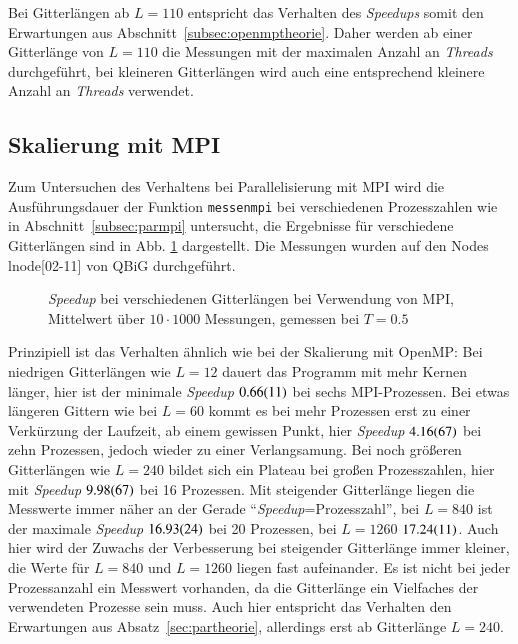 	
	Bei Gitterlängen ab $L=110$ entspricht das Verhalten des \textit{Speedups} somit den Erwartungen aus Abschnitt~\ref{subsec:openmptheorie}. Daher werden ab einer Gitterlänge von $L=110$ die Messungen mit der maximalen Anzahl an \textit{Threads} durchgeführt, bei kleineren Gitterlängen wird auch eine entsprechend kleinere Anzahl an \textit{Threads} verwendet. 
	
	\subsection{Skalierung mit MPI}
	\label{subsec:ergebnissempi}
	
	Zum Untersuchen des Verhaltens bei Parallelisierung mit MPI wird die Ausführungsdauer der Funktion \texttt{messenmpi} bei verschiedenen Prozesszahlen wie in Abschnitt~\ref{subsec:parmpi} untersucht, die Ergebnisse für verschiedene Gitterlängen sind in Abb. \ref{fig:skalierunglaengempi} dargestellt. Die Messungen wurden auf den Nodes lnode[02-11] von QBiG durchgeführt.
	
		\begin{figure}[htbp]
			
			\caption[\textit{Speedup} bei verschiedenen Gitterlängen bei Verwendung von MPI]{\textit{Speedup} bei verschiedenen Gitterlängen bei Verwendung von MPI, Mittelwert über $10 \cdot 1000$ Messungen, gemessen bei $T=\num{0,5}$}
			\label{fig:skalierunglaengempi}
		\end{figure}
		
	Prinzipiell ist das Verhalten ähnlich wie bei der Skalierung mit OpenMP: Bei niedrigen Gitterlängen wie $L=12$ dauert das Programm mit mehr Kernen länger, hier ist der minimale \textit{Speedup} $\num{0,66\pm0,11}$ bei sechs MPI-Prozessen. Bei etwas längeren Gittern wie bei $L=60$ kommt es bei mehr Prozessen erst zu einer Verkürzung der Laufzeit, ab einem gewissen Punkt, hier \textit{Speedup} $\num{4,16\pm0,67}$ bei zehn Prozessen, jedoch wieder zu einer Verlangsamung. Bei noch größeren Gitterlängen wie $L=240$ bildet sich ein Plateau bei großen Prozesszahlen, hier mit \textit{Speedup} $\num{9,98\pm 0,67}$ bei 16 Prozessen. Mit steigender Gitterlänge liegen die Messwerte immer näher an der Gerade \enquote{\textit{Speedup}=Prozesszahl}, bei $L=840$ ist der maximale \textit{Speedup} $\num{16,93\pm0,24}$ bei 20 Prozessen, bei $L=1260$ $\num{17,24\pm0,11}$. Auch hier wird der Zuwachs der Verbesserung bei steigender Gitterlänge immer kleiner, die Werte für $L=840$ und $L=1260$ liegen fast aufeinander. Es ist nicht bei jeder Prozessanzahl ein Messwert vorhanden, da die Gitterlänge ein Vielfaches der verwendeten Prozesse sein muss.
	Auch hier entspricht das Verhalten den Erwartungen aus Absatz~\ref{sec:partheorie}, allerdings erst ab Gitterlänge $L=240$.

